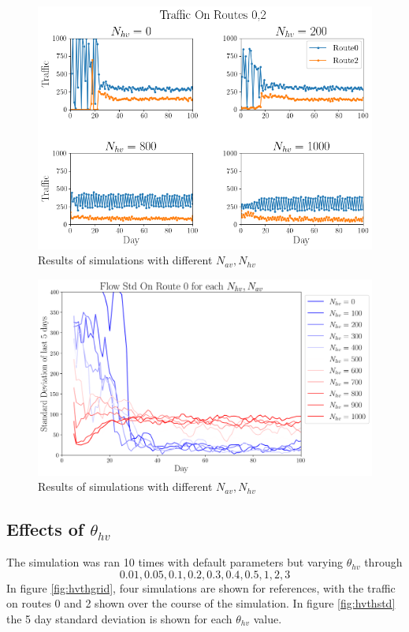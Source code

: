\documentclass[12pt, a4paper, onecolumn]{article}
\begin{document}
\begin{figure}[h!]
	\centering
	\includegraphics[scale=.5]{hv_vs_av_grid.png}
	\caption{Results of simulations with different $N_{av},N_{hv}$}
	\label{fig:Nhvavgrid}
	\end{figure}

\begin{figure}[h!]
	\centering
	\includegraphics[scale=.5]{hv_av_std.png}
	\caption{Results of simulations with different $N_{av},N_{hv}$}
	\label{fig:Nhvav}
	\end{figure}


\subsection{Effects of $\theta_{hv}$}
The simulation was ran 10 times with default parameters but varying $\theta_{hv}$ through
$$0.01, 0.05, 0.1, 0.2, 0.3, 0.4, 0.5, 1, 2, 3$$
In figure \ref{fig:hvthgrid}, four simulations are shown for references, with the traffic on routes 0 and 2 shown over the course of the simulation. In figure \ref{fig:hvthstd} the 5 day standard deviation is shown for each $\theta_{hv}$ value.
\end{document}
